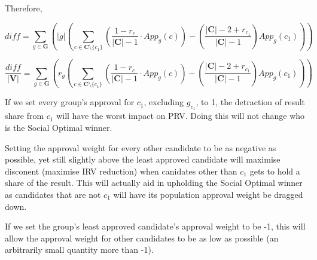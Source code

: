 \documentclass{article}
\begin{document}
Therefore,

\begin{equation}
diff = \sum^{}_{g \in \boldsymbol{G}}{\left(|g| \left( \sum^{}_{c \in \boldsymbol{C} \setminus \{c_1\}}{\left(\frac{1-r_c}{|\boldsymbol{C}|-1} \cdot App_g(c)\right)} - \left(\frac{|\boldsymbol{C}|-2+r_{c_1}}{|\boldsymbol{C}|-1}\right)App_g(c_1) \right) \right)}
\end{equation}

\begin{equation}
\frac{diff}{|\boldsymbol{V}|} = \sum^{}_{g \in \boldsymbol{G}}{\left(r_g \left( \sum^{}_{c \in \boldsymbol{C} \setminus \{c_1\}}{\left(\frac{1-r_c}{|\boldsymbol{C}|-1} \cdot App_g(c)\right)} - \left(\frac{|\boldsymbol{C}|-2+r_{c_1}}{|\boldsymbol{C}|-1}\right)App_g(c_1) \right) \right)}
\end{equation}

If we set every group's approval for $c_1$, excluding $g_{c_1}$, to 1, the detraction of result share from $c_1$ will have the worst impact on PRV. Doing this will not change who is the Social Optimal winner.

Setting the approval weight for every other candidate to be as negative as possible, yet still slightly above the least approved candidate will maximise disconent (maximise IRV reduction) when canidates other than $c_1$ gets to hold a share of the result. This will actually aid in upholding the Social Optimal winner as candidates that are not $c_1$ will have its population approval weight be dragged down.

If we set the group's least approved candidate's approval weight to be -1, this will allow the approval weight for other candidates to be as low as possible (an arbitrarily small quantity more than -1).
\end{document}
